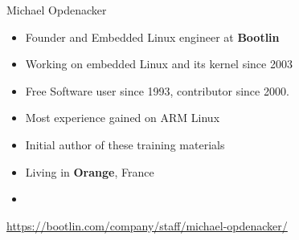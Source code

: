 \begin{frame}{Michael Opdenacker}
    \begin{itemize}
	\item Founder and Embedded Linux engineer at {\bf Bootlin}
	\item Working on embedded Linux and its kernel since 2003
	\item Free Software user since 1993, contributor since 2000.
	\item Most experience gained on ARM Linux
	\item Initial author of these training materials
	\item Living in {\bf Orange}, France
	\item {}
    \end{itemize}
    {\small \url{https://bootlin.com/company/staff/michael-opdenacker/}}
\end{frame}
